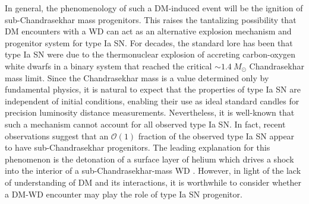 \documentclass[twocolumn, preprintnumbers,amsmath,amssymb,prd, superscriptaddress]{revtex4}
\newcommand{\OO}{\mathcal{O}}
\begin{document}
In general, the phenomenology of such a DM-induced event will be the ignition of sub-Chandrasekhar mass progenitors.
This raises the tantalizing possibility that DM encounters with a WD can act as an alternative explosion mechanism and progenitor system for type Ia SN.
For decades, the standard lore has been that type Ia SN were due to the thermonuclear explosion of accreting carbon-oxygen white dwarfs in a binary system that reached the critical $\sim 1.4 ~M_{\odot}$ Chandrasekhar mass limit.
Since the Chandrasekhar mass is a value determined only by fundamental physics, it is natural to expect that the properties of type Ia SN are independent of initial conditions, enabling their use as ideal standard candles for precision luminosity distance measurements.
Nevertheless, it is well-known that such a mechanism cannot account for all observed type Ia SN.
In fact, recent observations \cite{Scalzo:2014sap, Scalzo:2014wxa} suggest that an $\OO(1)$ fraction of the observed type Ia SN appear to have sub-Chandrasekhar progenitors.
The leading explanation for this phenomenon is the detonation of a surface layer of helium which drives a shock into the interior of a sub-Chandrasekhar-mass WD \cite{Woosley1994,Fink:2007fv}.
However, in light of the lack of understanding of DM and its interactions, it is worthwhile to consider whether a DM-WD encounter may play the role of type Ia SN progenitor.
\end{document}
